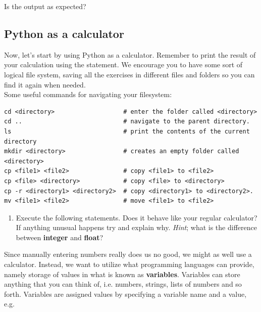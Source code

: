\documentclass{article}
\begin{document}
Is the output as expected? 

\subsection{Python as a calculator}


Now, let's start by using Python as a calculator.
Remember to print the result of your calculation using the  statement.
We encourage you to have some sort of logical file system, saving all the exercises in
different files and folders so you can find it again when needed. \\

Some useful commands for navigating your filesystem: \\

\begin{lstlisting}
cd <directory>                   # enter the folder called <directory>
cd ..                            # navigate to the parent directory.
ls                               # print the contents of the current directory
mkdir <directory>                # creates an empty folder called <directory>
cp <file1> <file2>               # copy <file1> to <file2>
cp <file> <directory>            # copy <file> to <directory>
cp -r <directory1> <directory2>  # copy <directory1> to <directory2>.
mv <file1> <file2>               # move <file1> to <file2>
\end{lstlisting}

\begin{enumerate}
    \item Execute the following statements. Does it behave like your regular
    calculator? If anything unusual happens try and explain why.
    {\em Hint}; what is the difference between {\bf integer} and {\bf float}?

    \begin{centering}
    \end{centering}
\end{enumerate}

Since manually entering numbers really does us no good, we might as well use a
calculator. Instead, we want to utilize what programming languages can provide,
namely storage of values in what is known as {\bf variables}. Variables can store
anything that you can think of, i.e. numbers, strings, lists of numbers and so
forth. Variables are assigned values by specifying a variable name and a value, e.g.
\end{document}
